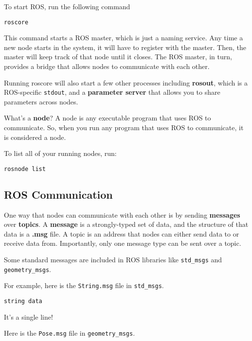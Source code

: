 To start ROS, run the following command 
\begin{lstlisting}
roscore
\end{lstlisting}
This command starts a ROS master, which is just a naming service. Any time a new node starts in the system, it will have to register with the master. Then, the master will keep track of that node until it closes. The ROS master, in turn, provides a bridge that allows nodes to communicate with each other.

Running roscore will also start a few other processes including \textbf{rosout}, which is a ROS-specific \texttt{stdout}, and a \textbf{parameter server} that allows you to share parameters across nodes.   

What's a \textbf{node}? A node is any executable program that uses ROS to communicate. So, when you run any program that uses ROS to communicate, it is considered a node.

To list all of your running nodes, run:

\begin{lstlisting}
rosnode list
\end{lstlisting}

\subsection{ROS Communication}
One way that nodes can communicate with each other is by sending \textbf{messages} over \textbf{topics}. A \textbf{message} is a strongly-typed set of data, and the structure of that data is a \textbf{.msg} file. A topic is an address that nodes can either send data to or receive data from. Importantly, only one message type can be sent over a topic. 

Some standard messages are included in ROS libraries like \texttt{std\_msgs} and \texttt{geometry\_msgs}.

For example, here is the \texttt{String.msg} file in \texttt{std\_msgs}.

\begin{lstlisting}
string data
\end{lstlisting}


It's a single line!

Here is the \texttt{Pose.msg} file in \texttt{geometry\_msgs}.



